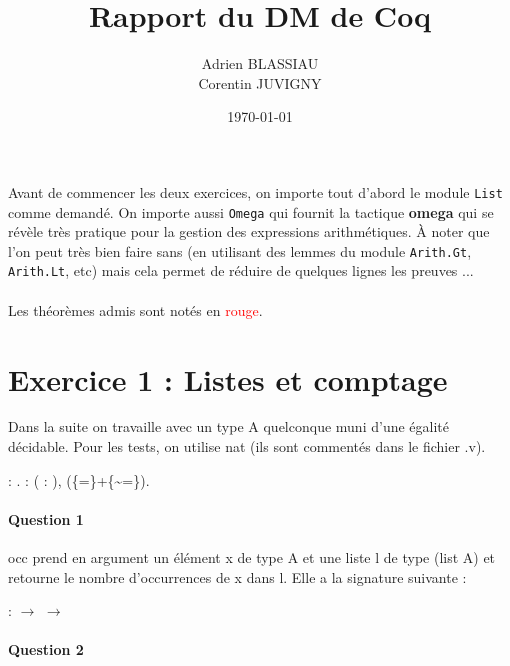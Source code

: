 \documentclass{report}
\title{Rapport du DM de Coq}
\author{Adrien BLASSIAU\\Corentin JUVIGNY}
\date{\today}
\begin{document}
\maketitle

Avant de commencer les deux exercices, on importe tout d'abord le module \texttt{List} comme demandé. On importe aussi \texttt{Omega} qui fournit la tactique \textbf{omega} qui se révèle très pratique pour la gestion des expressions arithmétiques. À noter que l'on peut très bien faire sans (en utilisant des lemmes du module \texttt{Arith.Gt}, \texttt{Arith.Lt}, etc) mais cela permet de réduire de quelques lignes les preuves ...\\\\
\noindent Les théorèmes admis sont notés en \textcolor{red}{rouge}.

\section{Exercice 1 : Listes et comptage}

Dans la suite on travaille avec un type A quelconque muni d’une égalité décidable. Pour les tests, on utilise nat (ils sont commentés dans le fichier .v).
\begin{coqdoccode}
\coqdocemptyline
\coqdocnoindent
{}  : .\coqdoceol
\coqdocemptyline
\coqdocnoindent
{}  : \coqdockw{\ensuremath{\forall}} (  : ), (\{=\}+\{\~{}=\}).\coqdoceol
\coqdocemptyline
\end{coqdoccode}

\paragraph{Question 1}

occ prend en argument un élément x de type A et une liste l de type (list A) et retourne le nombre d’occurrences de x dans l. Elle a la signature suivante :

\noindent
\noindent\begin{coqdoccode}
\coqdocemptyline
\coqdocnoindent
{} :
 \ensuremath{\rightarrow}
  \ensuremath{\rightarrow} 
\coqdocemptyline
\end{coqdoccode}

\paragraph{Question 2}
\end{document}
